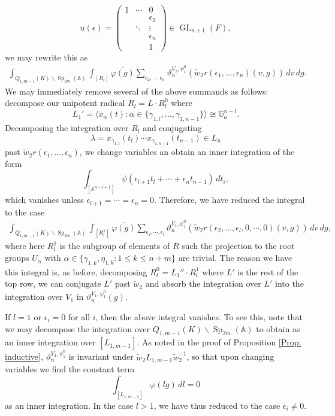 \documentclass[11pt,reqno]{amsart}
\theoremstyle{definition}
\theoremstyle{remark}
\theoremstyle{definition}
\begin{document}
\[
u({\epsilon}) = \left(\begin{array}{ccc}
					1&\cdots&0\\
					&&{\epsilon}_2\\
					&\ddots&\vdots\\
					&&{\epsilon}_n\\
					&&1
					\end{array}\right)\in \operatorname{GL}_{n+1}(F),
\]
we may rewrite this as 
\begin{align}\label{eqn: unravelled step 1}
\int_{Q_{1,m-1}(K)\backslash\operatorname{Sp}_{2m}({\mathbb A})}\int_{[R_l]}\overline{\varphi(g)}\sum_{{\epsilon}_2,\cdots,{\epsilon}_n}\vartheta^{V_1,\psi_1^0}_{n}(\tilde{w}_2 r({\epsilon}_1,\ldots,{\epsilon}_n)(v,g))\,dv\,dg.
\end{align}
We may immediately remove several of the above summands as follows: decompose our unipotent radical $R_l = L\cdot R_l^0$ where 
\[
L_1' ={\langle} x_{\alpha}(t) : {\alpha} \in \{{\gamma}_{1,l},\ldots, {\gamma}_{1,n-1}\}{\rangle}\cong \mathbb{G}_a^{n-l}.
\] 
Decomposing the integration over $R_l$ and conjugating $${\lambda} = x_{{\gamma}_{1,l}}(t_{l})\cdots x_{{\gamma}_{1,n-1}}(t_{n-1})\in L_{\mathbb A}$$ past $\tilde{w}_2r({\epsilon}_1,\ldots,{\epsilon}_n)$, we change variables an obtain an inner integration of the form
\[
\int_{[{\mathbb A}^{n-l+1}]}\psi({\epsilon}_{l+1}t_l+\cdots +{\epsilon}_nt_{n-1})\,dt_i,
\]
which vanishes unless ${\epsilon}_{l+1}=\cdots={\epsilon}_n=0$. Therefore, we have reduced the integral to the case
\begin{align}\label{eqn: unravel step 2}
\int_{Q_{1,m-1}(K)\backslash\operatorname{Sp}_{2m}({\mathbb A})}\int_{[R^1_l]}\overline{\varphi(g)}\sum_{{\epsilon}_2,\cdots,{\epsilon}_l}\vartheta^{V_1,\psi_1^0}_{n}(\tilde{w}_2 r({\epsilon}_2,\ldots,{\epsilon}_{l},0,\cdots,0)(v,g))\,dv\,dg,
\end{align}
where here $R_l^1$ is the subgroup of elements of $R$ such the projection to the root groups $U_{\alpha}$ with ${\alpha}\in\{{\gamma}_{1,k},\eta_{1,k}: 1\leq k\leq n+m\}$ are trivial. The reason we have this integral is, as before, decomposing $R_l^0 = L_1''\cdot R_l^1$ where $L'$ is the rest of the top row, we can conjugate $L'$ past $\tilde{w}_2$ and absorb the integration over $L'$ into the integration over $V_1$ in $\vartheta^{V_1,\psi_1^0}_{n}(g)$.

If $l=1$ or ${\epsilon}_i=0$ for all $i$, then the above integral vanishes. To see this, note that we may decompose the integration over $Q_{1,m-1}(K)\backslash\operatorname{Sp}_{2m}({\mathbb A})$ to obtain as an inner integration over $[L_{1,m-1}]$. As noted in the proof of Proposition \ref{Prop: inductive}, $\vartheta^{V_1,\psi_1^0}_{n}$ is invariant under $\tilde{w}_2 L_{1,m-1}\tilde{w}_2^{-1}$, so that upon changing variables we find the constant term
\[
\int_{[L_{1,m-1}]}\varphi(lg)\,dl =0
\] 
as an inner integration. In the case $l>1$, we have thus reduced to the case ${\epsilon}_i\neq 0$. 
\end{document}
